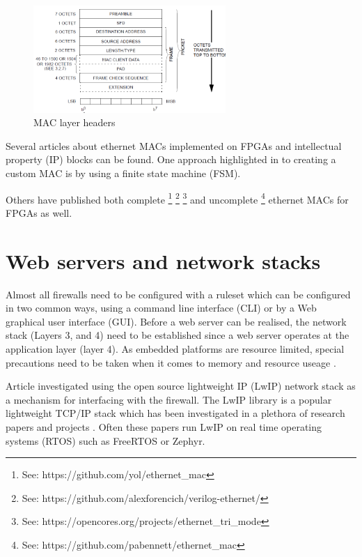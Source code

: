 \begin{figure}[h]
    \centering
    \includegraphics[width=0.65\textwidth]{Images/mac_packet.png}
    \caption{MAC layer headers \cite{IEEE802.3-2012}}
    \label{fig:ieee-mac-headers}
\end{figure}


Several articles \cite{OptimisedEthernetMAC} \cite{EthernetAXI} \cite{EthernetRMII} about ethernet MACs implemented on FPGAs and 
intellectual property (IP) blocks can be found. One approach highlighted in \cite{OptimisedEthernetMAC} to creating a custom MAC is by using a finite state 
machine (FSM). 

Others have published both complete \footnote[1]{See: https://github.com/yol/ethernet\_mac} \footnote[2]{See: https://github.com/alexforencich/verilog-ethernet/} 
\footnote[3]{See: https://opencores.org/projects/ethernet\_tri\_mode} and uncomplete
\footnote[4]{See: https://github.com/pabennett/ethernet\_mac} ethernet MACs for FPGAs as well.




\section{Web servers and network stacks}

Almost all firewalls need to be configured with a ruleset which can be configured in two common ways, using a command line interface (CLI) 
or by a Web graphical user interface (GUI). Before a web server can be realised, the network stack (Layers 3, and 4) need to be established since a web server 
operates at the application layer (layer 4). As embedded platforms are resource limited, special precautions need to be taken when it comes to memory and resource 
useage \cite{OptimCortexLwIP}.

Article \cite{LwIPFPGAFirewall} investigated using the open source lightweight IP (LwIP) network stack as a mechanism for interfacing with the firewall. 
The LwIP library is a popular lightweight TCP/IP stack which has been investigated in a plethora of research papers and projects \cite{ImprovemntOptimLWIP} 
\cite{OptimCortexLwIP}. Often these papers run LwIP on real time operating systems (RTOS) such as FreeRTOS or Zephyr.

